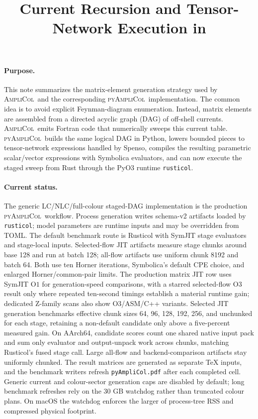 \documentclass[10pt]{article}
\title{\vspace{-2.0em}Current Recursion and Tensor-Network Execution in \PAC}
\author{}
\date{\vspace{-3.0em}}
\newcommand{\AC}{\textsc{AmpliCol}}
\newcommand{\PAC}{\textsc{pyAmpliCol}}
\begin{document}
\maketitle
\vspace{-1.2em}

\paragraph{Purpose.}
This note summarizes the matrix-element generation strategy used by \AC\ and
the corresponding \PAC\ implementation.  The common idea is to avoid explicit
Feynman-diagram enumeration.  Instead, matrix elements are assembled from a
directed acyclic graph (DAG) of off-shell currents.  \AC\ emits Fortran code
that numerically sweeps this current table.  \PAC\ builds the same logical DAG
in Python, lowers bounded pieces to tensor-network expressions handled by
Spenso, compiles the resulting parametric scalar/vector expressions with
Symbolica evaluators, and can now execute the staged sweep from Rust through
the PyO3 runtime \texttt{rusticol}.

\paragraph{Current status.}
The generic LC/NLC/full-colour staged-DAG implementation is the production
\PAC\ workflow.  Process generation writes schema-v2 artifacts loaded by
\texttt{rusticol}; model parameters are runtime inputs and may be overridden
from TOML.  The default benchmark route is Rusticol with SymJIT stage
evaluators and stage-local inputs.  Selected-flow JIT artifacts measure stage
chunks around base 128 and run at batch 128; all-flow artifacts use uniform
chunk 8192 and batch 64.  Both use ten Horner iterations, Symbolica's default
CPE choice, and enlarged Horner/common-pair limits.  The production matrix JIT
row uses SymJIT
\(\mathrm{O}1\) for generation-speed comparisons, with a starred selected-flow
O3 result only where repeated ten-second timings establish a material runtime
gain; dedicated Z-family scans
also show O3/ASM/C++ variants.  Selected JIT generation benchmarks effective
chunk sizes 64, 96, 128, 192, 256, and unchunked for each stage, retaining a
non-default candidate only above a five-percent measured gain.  On AArch64,
candidate scores count one shared native input pack and sum only evaluator and
output-unpack work across chunks, matching Rusticol's fused stage call.  Large all-flow
and backend-comparison artifacts stay uniformly chunked.  The result matrices
are generated as separate
\TeX{} inputs, and the benchmark writers refresh \texttt{pyAmpliCol.pdf}
after each completed cell.  Generic current and colour-sector generation caps
are disabled by default; long benchmark refreshes rely on the 30 GB watchdog
rather than truncated colour plans.  On macOS the watchdog enforces the larger
of process-tree RSS and compressed physical footprint.
\end{document}
